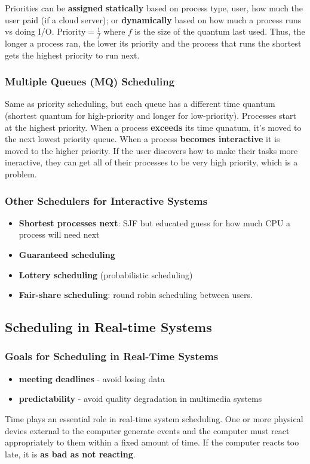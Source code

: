 \documentclass{article}
\newcommand{\bold}[1]{\textbf{#1}}
\renewcommand{\b}{\item[$\circ$]}
\newcommand{\newlist}{\begin{itemize}}
\renewcommand{\endlist}{\end{itemize}}
\begin{document}
    \noindent Priorities can be \bold{assigned} \bold{statically} based on process type, user, how much the user paid (if a cloud server); or \bold{dynamically} based on how much a process runs vs doing I/O. $\textrm{Priority} = \frac{1}{f}$ where $f$ is the size of the quantum last used. Thus, the longer a process ran, the lower its priority and the process that runs the shortest gets the highest priority to run next.

    \subsubsection{Multiple Queues (MQ) Scheduling}

    Same as priority scheduling, but each queue has a different time quantum (shortest quantum for high-priority and longer for low-priority). Processes start at the highest priority. When a process \bold{exceeds} its time qunatum, it's moved to the next lowest priority queue. When a process \bold{becomes interactive} it is moved to the higher priority. If the user discovers how to make their tasks more ineractive, they can get all of their processes to be very high priority, which is a problem. 

    \subsubsection{Other Schedulers for Interactive Systems}

    \newlist
    \b \bold{Shortest processes next}: SJF but educated guess for how much CPU a process will need next
    \b \bold{Guaranteed scheduling}
    \b \bold{Lottery scheduling} (probabilistic scheduling)
    \b \bold{Fair-share scheduling}: round robin scheduling between users. 
    \endlist

\subsection{Scheduling in Real-time Systems}
    
    \subsubsection{Goals for Scheduling in Real-Time Systems}

    \newlist
    \b \textbf{meeting deadlines} - avoid losing data
    \b \textbf{predictability} - avoid quality degradation in multimedia systems
    \endlist

    \noindent Time plays an essential role in real-time system scheduling. One or more physical devies external to the computer generate events and the computer must react appropriately to them within a fixed amount of time. If the computer reacts too late, it is \bold{as bad as not reacting}. \\
\end{document}
